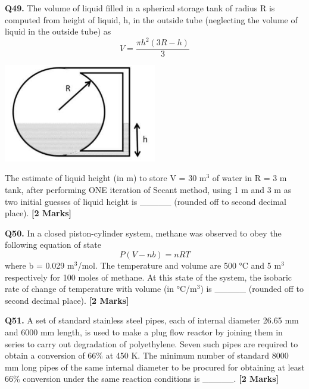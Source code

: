 \documentclass[11pt]{article}
\newcommand{\questionb}[2]{
    \noindent\textbf{Q#2.} #1 \hfill \textbf{[2 Marks]}
}
\begin{document}
\questionb{The volume of liquid filled in a spherical storage tank of radius R is computed from height of liquid, h, in the outside tube (neglecting the volume of liquid in the outside tube) as
\[V = \frac{\pi h^2 (3R - h)}{3}\]

\begin{center}
\includegraphics[width=0.5\textwidth]{figures/Q49.png}
\end{center}
The estimate of liquid height (in m) to store V = 30 m\(^3\) of water in R = 3 m tank, after performing ONE iteration of Secant method, using 1 m and 3 m as two initial guesses of liquid height is \_\_\_\_\_ (rounded off to second decimal place).}{49}
\vspace{0.5cm}
\questionb{In a closed piston-cylinder system, methane was observed to obey the following equation of state
\[P (V - nb) = nRT\]
where b = 0.029 m\(^3\)/mol. The temperature and volume are 500 °C and 5 m\(^3\) respectively for 100 moles of methane. At this state of the system, the isobaric rate of change of temperature with volume (in °C/m\(^3\)) is \_\_\_\_\_ (rounded off to second decimal place).}{50}
\vspace{0.5cm}

\questionb{A set of standard stainless steel pipes, each of internal diameter 26.65 mm and 6000 mm length, is used to make a plug flow reactor by joining them in series to carry out degradation of polyethylene. Seven such pipes are required to obtain a conversion of 66\% at 450 K. The minimum number of standard 8000 mm long pipes of the same internal diameter to be procured for obtaining at least 66\% conversion under the same reaction conditions is \_\_\_\_\_.}{51}
\vspace{0.5cm}
\end{document}
